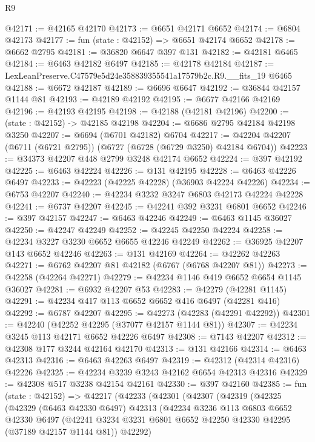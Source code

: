 \begin{lexlean}{R9}
\begin{coremodule}
@42171 := @42165 @42170
@42173 := @6651 @42171 @6652
@42174 := @6804 @42173
@42177 := fun (state : @42152) => @6651 @42174 @6652
@42178 := @6662 @2795
@42181 := @36820 @6647 @397 @131
@42182 := @42181 @6465
@42184 := @6463 @42182 @6497
@42185 := @42178 @42184
@42187 := LexLeanPreserve.C47579e5d24e358839355541a17579b2c.R9.__fits_19 @6465
@42188 := @6672 @42187
@42189 := @6696 @6647
@42192 := @36844 @42157 @1144 @81
@42193 := @42189 @42192
@42195 := @6677 @42166 @42169
@42196 := @42193 @42195
@42198 := @42188 (@42181 @42196)
@42200 := (state : @42152) -> @42185 @42198
@42204 := @6686 @2795 @42184 @42198 @3250
@42207 := @6694 (@6701 @42182) @6704
@42217 := @42204 @42207 (@6711 (@6721 @2795)) (@6727 (@6728 (@6729 @3250) @42184 @6704))
@42223 := @34373 @42207 @448 @2799 @3248 @42174 @6652
@42224 := @397 @42192
@42225 := @6463 @42224
@42226 := @131 @42195
@42228 := @6463 @42226 @6497
@42233 := @42223 (@42225 @42228) (@36903 @42224 @42226)
@42234 := @6753 @42207
@42240 := @42234 @3232 @3247 @6803 @42173 @42224 @42228
@42241 := @6737 @42207
@42245 := @42241 @392 @3231 @6801 @6652
@42246 := @397 @42157
@42247 := @6463 @42246
@42249 := @6463 @1145 @36027
@42250 := @42247 @42249
@42252 := @42245 @42250 @42224
@42258 := @42234 @3227 @3230 @6652 @6655 @42246 @42249
@42262 := @36925 @42207 @143 @6652 @42246
@42263 := @131 @42169
@42264 := @42262 @42263
@42271 := @6762 @42207 @81 @42182 (@6767 (@6768 @42207 @81))
@42273 := @42258 (@42264 @42271)
@42279 := @42234 @1146 @419 @6652 @6654 @1145 @36027
@42281 := @6932 @42207 @53
@42283 := @42279 (@42281 @1145)
@42291 := @42234 @417 @113 @6652 @6652 @416 @6497 (@42281 @416)
@42292 := @6787 @42207
@42295 := @42273 (@42283 (@42291 @42292))
@42301 := @42240 (@42252 @42295 (@37077 @42157 @1144 @81))
@42307 := @42234 @3245 @113 @42171 @6652 @42226 @6497
@42308 := @7143 @42207
@42312 := @42308 @177 @3244 @42164 @42170
@42313 := @131 @42166
@42314 := @6463 @42313
@42316 := @6463 @42263 @6497
@42319 := @42312 (@42314 @42316) @42226
@42325 := @42234 @3239 @3243 @42162 @6654 @42313 @42316
@42329 := @42308 @517 @3238 @42154 @42161
@42330 := @397 @42160
@42385 := fun (state : @42152) =>
  @42217
    (@42233
      (@42301
        (@42307
          (@42319
            (@42325
              (@42329
                (@6463 @42330 @6497)
                @42313
                (@42234
                  @3236
                  @113
                  @6803
                  @6652
                  @42330
                  @6497
                  (@42241 @3234 @3231 @6801 @6652 @42250 @42330 @42295 (@37189 @42157 @1144 @81))
                  @42292)

\end{coremodule}
\end{lexlean}
